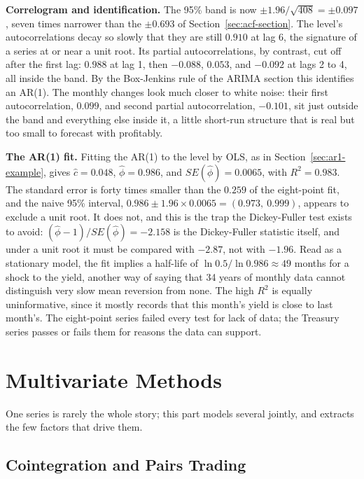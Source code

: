 \documentclass[../ai_in_finance]{subfiles}
\begin{document}
\textbf{Correlogram and identification.} The 95\% band is now $\pm 1.96/\sqrt{408} = \pm 0.097$, seven times narrower than the $\pm 0.693$ of Section~\ref{sec:acf-section}. The level's autocorrelations decay so slowly that they are still $0.910$ at lag 6, the signature of a series at or near a unit root. Its partial autocorrelations, by contrast, cut off after the first lag: $0.988$ at lag 1, then $-0.088$, $0.053$, and $-0.092$ at lags 2 to 4, all inside the band. By the Box-Jenkins rule of the ARIMA section this identifies an AR(1). The monthly changes look much closer to white noise: their first autocorrelation, $0.099$, and second partial autocorrelation, $-0.101$, sit just outside the band and everything else inside it, a little short-run structure that is real but too small to forecast with profitably.

\textbf{The AR(1) fit.} Fitting the AR(1) to the level by OLS, as in Section~\ref{sec:ar1-example}, gives $\hat c = 0.048$, $\hat\phi = 0.986$, and $SE(\hat\phi) = 0.0065$, with $R^2 = 0.983$. The standard error is forty times smaller than the $0.259$ of the eight-point fit, and the naive 95\% interval, $0.986 \pm 1.96 \times 0.0065 = (0.973,\ 0.999)$, appears to exclude a unit root. It does not, and this is the trap the Dickey-Fuller test exists to avoid: $(\hat\phi - 1)/SE(\hat\phi) = -2.158$ is the Dickey-Fuller statistic itself, and under a unit root it must be compared with $-2.87$, not with $-1.96$. Read as a stationary model, the fit implies a half-life of $\ln 0.5/\ln 0.986 \approx 49$ months for a shock to the yield, another way of saying that 34 years of monthly data cannot distinguish very slow mean reversion from none. The high $R^2$ is equally uninformative, since it mostly records that this month's yield is close to last month's. The eight-point series failed every test for lack of data; the Treasury series passes or fails them for reasons the data can support.

\section{Multivariate Methods}

One series is rarely the whole story; this part models several jointly, and extracts the few factors that drive them.

\subsection{Cointegration and Pairs Trading}
\label{sec:cointegration}
\end{document}
